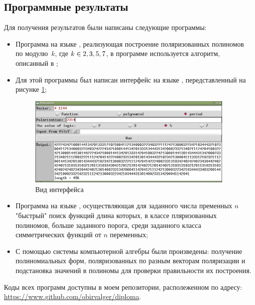 \documentclass[bibliography=totoc, a4paper, 14pt]{extarticle}
\def\in{\mathchar"3232\nobreak\discretionary{}{\usefont{OMS}{cmsy}{m}{n}\char50}{}}
\begin{document}
\subsection{Программные результаты}
Для получения результатов были написаны следующие программы:
\begin{itemize}
\item Программа на языке {}, реализующая построение поляризованных полиномов по
    модулю~$k$, где $k \in {2,3,5,7}$, в программе используется алгоритм, описанный в \cite{sm09};
\item Для этой программы был написан интерфейс на языке {}, передставленный на
    рисунке \ref{ps};
    \begin{figure}[h]
    \centering
    \includegraphics[width=0.95\textwidth]{polyscreen.png}
    \caption{Вид интерфейса \label{ps}}
    \end{figure}
\item Программа на языке {}, осуществляющая для заданного числа пременных $n$
    "быстрый"{} поиск функций длина которых, в классе пляризованных полиномов, больше заданного
    порога, среди заданного класса симметрических функций от $n$ переменных;
\item С помощью системы компьютерной алгебры  \cite{sage} были произведены: получение
    полиномиальных форм, поляризованных по разным векторам поляризации и подстановка значений в
    полиномы для проверки правильности их построения.
\end{itemize}
Коды всех программ доступны в моем репозитории, располеженном по адресу:
\mbox{\url{https://www.github.com/obirvalger/diploma}}.



\newpage
\tableofcontents

\makeatletter
\renewcommand*{\@biblabel}[1]{\hfill#1.}
\makeatother
\end{document}
